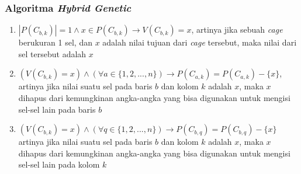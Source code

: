 \documentclass{beamer}
\begin{document}
\begin{frame}
\frametitle{Algoritma \textit{Hybrid Genetic}}
\begin{enumerate}
\item \begin{math}|P(C_{b,k})| = 1 \land x \in P(C_{b,k}) \rightarrow V(C_{b,k}) = x\end{math}, artinya jika sebuah \textit{cage} berukuran 1 sel, dan \begin{math}x\end{math} adalah nilai tujuan dari \textit{cage} tersebut, maka nilai dari sel tersebut adalah \begin{math}x\end{math}
\item \begin{math}(V(C_{b,k}) = x) \land (\forall a \in \{1, 2, ..., n\}) \rightarrow P(C_{a,k}) = P(C_{a,k}) - \{x\}\end{math}, artinya jika nilai suatu sel pada baris \begin{math}b\end{math} dan kolom \begin{math}k\end{math} adalah \begin{math}x\end{math}, maka \begin{math}x\end{math} dihapus dari kemungkinan angka-angka yang bisa digunakan untuk mengisi sel-sel lain pada baris \begin{math}b\end{math}
\item \begin{math}(V(C_{b,k}) = x) \land (\forall q \in \{1, 2, ..., n\}) \rightarrow P(C_{b,q}) = P(C_{b,q}) - \{x\}\end{math} artinya jika nilai suatu sel pada baris \begin{math}b\end{math} dan kolom \begin{math}k\end{math} adalah \begin{math}x\end{math}, maka \begin{math}x\end{math} dihapus dari kemungkinan angka-angka yang bisa digunakan untuk mengisi sel-sel lain pada kolom \begin{math}k\end{math}
\end{enumerate}
\end{frame}
\end{document}

